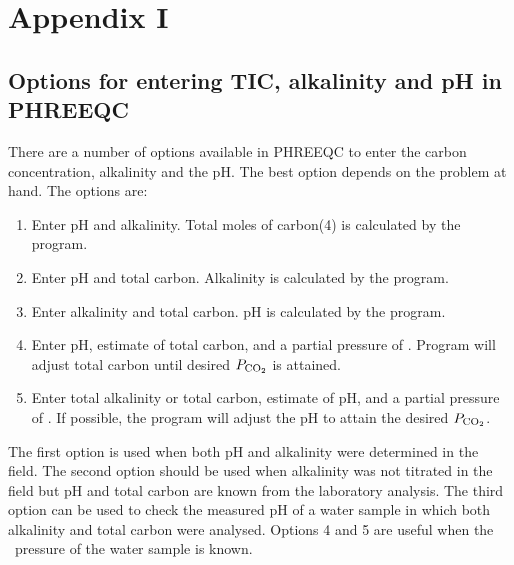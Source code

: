 \chapter*{Appendix I}


\def\shorttitle{Appendix I}

\section*{Options for entering TIC, alkalinity and pH in PHREEQC}
There are a number of options available in PHREEQC to enter the carbon concentration, alkalinity
and the pH. The best option depends on the problem at hand. The options are:

\begin{enumerate}
\item Enter pH and alkalinity. Total moles of carbon(4) is calculated by the program.
\item Enter pH and total carbon. Alkalinity is calculated by the program.
\item Enter alkalinity and total carbon. pH is calculated by the program.
\item Enter pH, estimate of total carbon, and a partial pressure of \co. Program will adjust total carbon
until desired $P_{\text{CO}_{2}}$ is attained.
\item Enter total alkalinity or total carbon, estimate of pH, and a partial pressure of \co. If possible, the
program will adjust the pH to attain the desired $P_{\text{CO}_{2}}$.
\end{enumerate}

The first option is used when both pH and alkalinity were determined in the field. The second option
should be used when alkalinity was not titrated in the field but pH and total carbon are known from
the laboratory analysis. The third option can be used to check the measured pH of a water sample in
which both alkalinity and total carbon were analysed. Options 4 and 5 are useful when the \co\
pressure of the water sample is known.